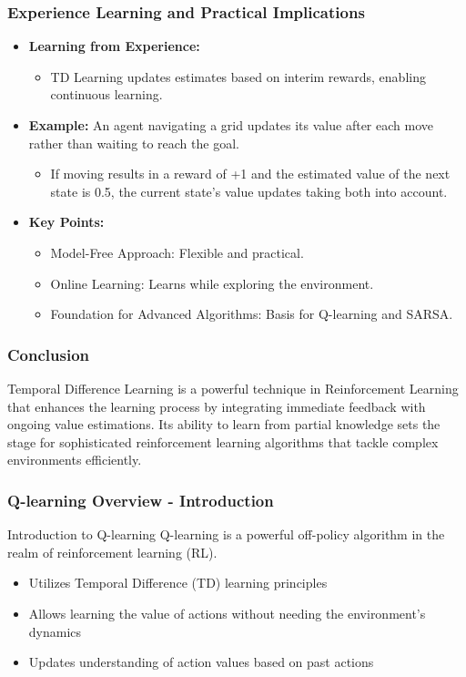 \documentclass[aspectratio=169]{beamer}
\begin{document}
\begin{frame}[fragile]
    \frametitle{Experience Learning and Practical Implications}
    \begin{itemize}
        \item \textbf{Learning from Experience:}
            \begin{itemize}
                \item TD Learning updates estimates based on interim rewards, enabling continuous learning.
            \end{itemize}
        
        \item \textbf{Example:}
            An agent navigating a grid updates its value after each move rather than waiting to reach the goal.
            \begin{itemize}
                \item If moving results in a reward of +1 and the estimated value of the next state is 0.5, the current state's value updates taking both into account.
            \end{itemize}
        
        \item \textbf{Key Points:}
            \begin{itemize}
                \item Model-Free Approach: Flexible and practical.
                \item Online Learning: Learns while exploring the environment.
                \item Foundation for Advanced Algorithms: Basis for Q-learning and SARSA.
            \end{itemize}
    \end{itemize}
\end{frame}

\begin{frame}[fragile]
    \frametitle{Conclusion}
    Temporal Difference Learning is a powerful technique in Reinforcement Learning that enhances the learning process by integrating immediate feedback with ongoing value estimations. Its ability to learn from partial knowledge sets the stage for sophisticated reinforcement learning algorithms that tackle complex environments efficiently.
\end{frame}

\begin{frame}[fragile]
    \frametitle{Q-learning Overview - Introduction}
    \begin{block}{Introduction to Q-learning}
        Q-learning is a powerful off-policy algorithm in the realm of reinforcement learning (RL).
        \begin{itemize}
            \item Utilizes Temporal Difference (TD) learning principles
            \item Allows learning the value of actions without needing the environment's dynamics
            \item Updates understanding of action values based on past actions
        \end{itemize}
    \end{block}
\end{frame}
\end{document}

